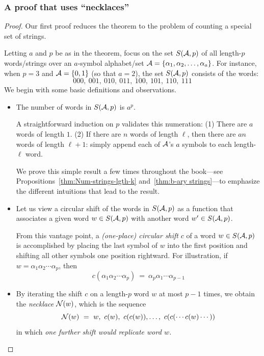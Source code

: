 \subsubsection{A proof that uses ``necklaces''}
\label{sec:FTL-necklaces}

\begin{proof}
Our first proof reduces the theorem to the problem of counting a special set of strings.

Letting $a$ and $p$ be as in the theorem, focus on the set $S(\mbox{$\cal A$},p)$ of all length-$p$ words/strings over an $a$-symbol alphabet/set $\mbox{$\cal A$} = \{ \alpha_1, \alpha_2, \ldots, \alpha_a \}$.  For instance, when $p=3$ and $\mbox{$\cal A$} = \{0,1\}$ (so that $a=2$), the set $S(\mbox{$\cal A$},p)$ consists of the words:
\[ 000, \ 001, \ 010, \ 011, \ 100, \ 101, \ 110, \ 111 \]
We begin with some basic definitions and observations.
\begin{itemize}
\item
The number of words in $S(\mbox{$\cal A$},p)$ is $a^p$.

\smallskip

A straightforward induction on $p$ validates this numeration:  (1) There are $a$ words of length $1$.  (2) If there are $n$ words of length $\ell$, then there are $an$ words of length $\ell+1$: simply append each of $\mbox{$\cal A$}$'s $a$ symbols to each length-$\ell$ word.

\smallskip

We prove this simple result a few times throughout the book---see Propositions~\ref{thm:Num-strings-lgth-k} and~\ref{thm:b-ary strings}---to emphasize the different intuitions that lead to the result.

\medskip\item
Let us view a circular shift of the words in $S(\mbox{$\cal A$},p)$ as a function that associates a given word $w \in S(\mbox{$\cal A$},p)$ with another word $w' \in S(\mbox{$\cal A$},p)$.

\smallskip

From this vantage point, a {\it (one-place) circular shift} $c$ of a word $w \in S(\mbox{$\cal A$},p)$ is accomplished by placing the last symbol of $w$ into the first position and shifting all other symbols one position rightward.  For illustration, if $w = \alpha_1 \alpha_2 \cdots \alpha_p$, then
\[ c(\alpha_1 \alpha_2 \cdots \alpha_p) \ = \ \alpha_p \alpha_1 \cdots \alpha_{p-1} \]

\medskip\item
By iterating the shift $c$ on a length-$p$ word $w$ at most $p-1$ times, we obtain the {\it necklace} $\mbox{$\cal N$}(w)$, which is the sequence
\[ \n(w) \ = \ w, \ c(w), \ c(c(w)), \ldots, \ c(c(\cdots c(w) \cdots )) \]
in which {\em one further shift would replicate word $w$.}


\end{itemize}
\end{proof}
